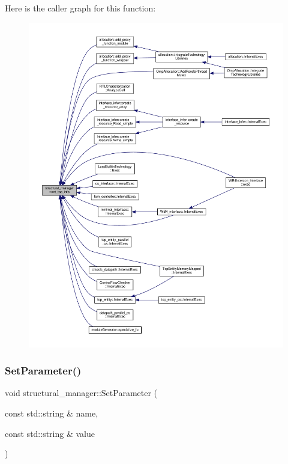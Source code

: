 Here is the caller graph for this function\+:
\nopagebreak
\begin{figure}[H]
\begin{center}
\leavevmode
\includegraphics[width=350pt]{d7/d6b/classstructural__manager_a848a594d01b214d2b17deefdc127ca71_icgraph}
\end{center}
\end{figure}
\mbox{\label{classstructural__manager_ad35143965dc81c7671ff7bad278add97}} 
\subsubsection{\texorpdfstring{Set\+Parameter()}{SetParameter()}}
{\footnotesize\ttfamily void structural\+\_\+manager\+::\+Set\+Parameter (\begin{DoxyParamCaption}\item[{const std\+::string \&}]{name,  }\item[{const std\+::string \&}]{value }\end{DoxyParamCaption})}



